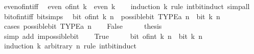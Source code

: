 \begin{isabellebody}
\isanewline
{}\isamarkupfalse%
\ even{\isacharunderscore}{\kern0pt}of{\isacharunderscore}{\kern0pt}int{\isacharunderscore}{\kern0pt}iff{\isacharcolon}{\kern0pt}\isanewline
\ \ {\isacartoucheopen}even\ {\isacharparenleft}{\kern0pt}of{\isacharunderscore}{\kern0pt}int\ k{\isacharparenright}{\kern0pt}\ {\isasymlongleftrightarrow}\ even\ k{\isacartoucheclose}\isanewline
%
\isadelimproof
\ \ %
\endisadelimproof
%
\isatagproof
{}\isamarkupfalse%
\ {\isacharparenleft}{\kern0pt}induction\ k\ rule{\isacharcolon}{\kern0pt}\ int{\isacharunderscore}{\kern0pt}bit{\isacharunderscore}{\kern0pt}induct{\isacharparenright}{\kern0pt}\ simp{\isacharunderscore}{\kern0pt}all%
\endisatagproof
{\isafoldproof}%
%
\isadelimproof
\isanewline
%
\endisadelimproof
\isanewline
{}\isamarkupfalse%
\ bit{\isacharunderscore}{\kern0pt}of{\isacharunderscore}{\kern0pt}int{\isacharunderscore}{\kern0pt}iff\ {\isacharbrackleft}{\kern0pt}bit{\isacharunderscore}{\kern0pt}simps{\isacharbrackright}{\kern0pt}{\isacharcolon}{\kern0pt}\isanewline
\ \ {\isacartoucheopen}bit\ {\isacharparenleft}{\kern0pt}of{\isacharunderscore}{\kern0pt}int\ k{\isacharparenright}{\kern0pt}\ n\ {\isasymlongleftrightarrow}\ possible{\isacharunderscore}{\kern0pt}bit\ TYPE{\isacharparenleft}{\kern0pt}{\isacharprime}{\kern0pt}a{\isacharparenright}{\kern0pt}\ n\ {\isasymand}\ bit\ k\ n{\isacartoucheclose}\isanewline
%
\isadelimproof
%
\endisadelimproof
%
\isatagproof
{}\isamarkupfalse%
\ {\isacharparenleft}{\kern0pt}cases\ {\isacartoucheopen}possible{\isacharunderscore}{\kern0pt}bit\ TYPE{\isacharparenleft}{\kern0pt}{\isacharprime}{\kern0pt}a{\isacharparenright}{\kern0pt}\ n{\isacartoucheclose}{\isacharparenright}{\kern0pt}\isanewline
\ \ \isamarkupfalse%
\ False\isanewline
\ \ \isamarkupfalse%
\ \isamarkupfalse%
\ {\isacharquery}{\kern0pt}thesis\isanewline
\ \ \ \ \isamarkupfalse%
\ {\isacharparenleft}{\kern0pt}simp\ add{\isacharcolon}{\kern0pt}\ impossible{\isacharunderscore}{\kern0pt}bit{\isacharparenright}{\kern0pt}\isanewline
{}\isamarkupfalse%
\isanewline
\ \ \isamarkupfalse%
\ True\isanewline
\ \ \isamarkupfalse%
\ \isamarkupfalse%
\ {\isacartoucheopen}bit\ {\isacharparenleft}{\kern0pt}of{\isacharunderscore}{\kern0pt}int\ k{\isacharparenright}{\kern0pt}\ n\ {\isasymlongleftrightarrow}\ bit\ k\ n{\isacartoucheclose}\isanewline
\ \ \isamarkupfalse%
\ {\isacharparenleft}{\kern0pt}induction\ k\ arbitrary{\isacharcolon}{\kern0pt}\ n\ rule{\isacharcolon}{\kern0pt}\ int{\isacharunderscore}{\kern0pt}bit{\isacharunderscore}{\kern0pt}induct{\isacharparenright}{\kern0pt}\isanewline

\end{isabellebody}
